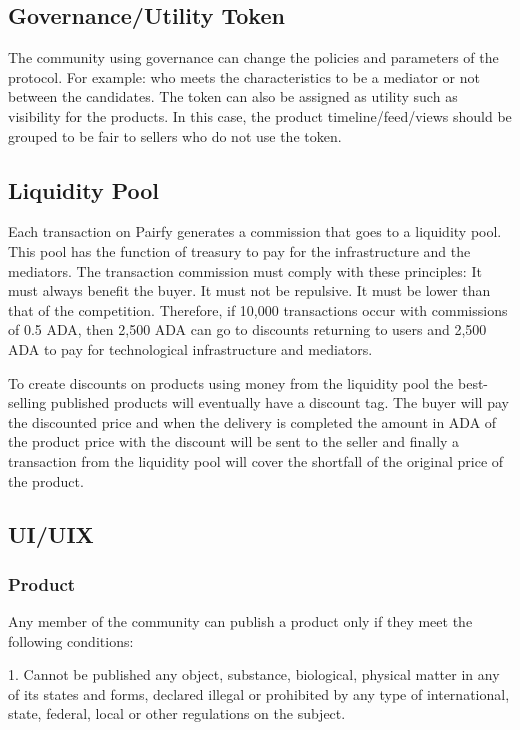 \documentclass[12pt]{article}
\begin{document}
\subsection { Governance/Utility Token} 

The community using governance can change the policies and parameters of the protocol. For example: who meets the characteristics to be a mediator or not between the candidates. The token can also be assigned as utility such as visibility for the products. In this case, the product timeline/feed/views should be grouped to be fair to sellers who do not use the token.


\subsection { Liquidity Pool }

Each transaction on Pairfy generates a commission that goes to a liquidity pool. This pool has the function of treasury to pay for the infrastructure and the mediators.
The transaction commission must comply with these principles: It must always benefit the buyer. It must not be repulsive. It must be lower than that of the competition. Therefore, if 10,000 transactions occur with commissions of 0.5 ADA, then 2,500 ADA can go to discounts returning to users and 2,500 ADA to pay for technological infrastructure and mediators. 

To create discounts on products using money from the liquidity pool the best-selling published products will eventually have a discount tag. The buyer will pay the discounted price and when the delivery is completed the amount in ADA of the product price with the discount will be sent to the seller and finally a transaction from the liquidity pool will cover the shortfall of the original price of the product.

\subsection{ UI/UIX }

\subsubsection { Product } 

Any member of the community can publish a product only if they meet the following conditions:

1. Cannot be published any object, substance, biological, physical matter in any of its states and forms, declared illegal or prohibited by any type of international, state, federal, local or other regulations on the subject.
\end{document}
